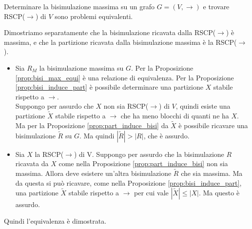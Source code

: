 \begin{corollary}
    Determinare la bisimulazione massima su un grafo $G = (V,\to)$ e trovare RSCP($\to$) di $V$ sono problemi equivalenti.
\end{corollary}
\begin{proof2}
    Dimostriamo separatamente che la bisimulazione ricavata dalla RSCP($\to$) è massima, e che la partizione ricavata dalla bisimulazione massima è la RSCP($\to$).
    \begin{itemize}
        \item Sia $R_M$ la bisimulazione massima su $G$. Per la Proposizione \ref*{prop:bisi_max_equi} è una relazione di equivalenza. Per la Proposizione \ref*{prop:bisi_induce_part} è possibile determinare una partizione $X$ stabile rispetto a $\to$.\\
              Suppongo per assurdo che $X$ non sia RSCP($\to$) di $V$, quindi esiste una partizione $\widetilde{X}$ stabile rispetto a $\to$ che ha meno blocchi di quanti ne ha $X$. Ma per la Proposizione \ref*{prop:part_induce_bisi} da
              $\widetilde{X}$ è possibile ricavare una bisimulazione $\widetilde{R}$ su $G$. Ma quindi $|\widetilde{R}| > |R|$, che è assurdo.
        \item Sia $X$ la RSCP($\to$) di V. Suppongo per assurdo che la bisimulazione $R$ ricavata da $X$ come nella Proposizione \ref*{prop:part_induce_bisi} non sia massima. Allora deve esistere un'altra bisimulazione $\widetilde{R}$ che
              sia massima. Ma da questa si può ricavare, come nella Proposizione \ref*{prop:bisi_induce_part}, una partizione $\widetilde{X}$ stabile rispetto a $\to$ per cui vale $|\widetilde{X}| \leq |X|$. Ma questo è assurdo.
    \end{itemize}
    Quindi l'equivalenza è dimostrata.
\end{proof2}

